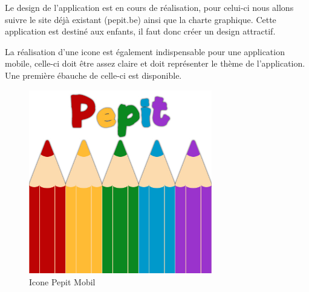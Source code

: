 Le design de l'application est en cours de réalisation, pour celui-ci nous allons suivre le site déjà existant (pepit.be) ainsi que la charte graphique. Cette application est destiné aux enfants, il faut donc créer un design attractif.


La réalisation d'une icone est également indispensable pour une application mobile, celle-ci doit \^{e}tre assez claire et doit représenter le thème de l'application. Une première ébauche de celle-ci est disponible.


\begin{figure}[H]
\begin{center}
\includegraphics[width=8cm]{images/icone_2}
\end{center}
\caption{Icone Pepit Mobil}
\label{Icone Pepit Mobil}
\end{figure}